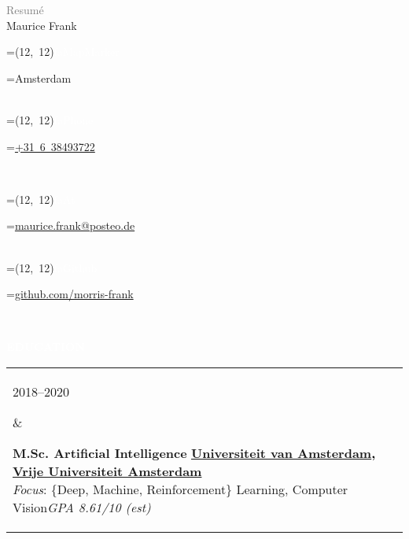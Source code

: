 \documentclass{article}
\newcommand{\vcenteredhbox}[1]{%
	\begingroup%
		\setbox0=\hbox{#1}\parbox{\wd0}{\box0}%
	\endgroup%
}
\newcommand{\icon}[3]{%
	\vcenteredhbox{\colorbox{primary}{\makebox(#2, #2){\textcolor{white}{\large\csname fa#1\endcsname}}}}%
	\hspace{0.2cm}%
	\vcenteredhbox{\textcolor{primary}{#3}}%
}
\newcommand{\cvsect}[1]{
	\vspace{\baselineskip}
	\colorbox{primary}{\textcolor{white}{\MakeUppercase{\textbf{#1}}}}\\
}
\newenvironment{entrylist}{
	\begin{longtable}[H]{l l}
}{
	\end{longtable}
}
\newcommand{\entry}[4]{%
	\parbox[t]{0.175\linewidth}{#1} &
	\parbox[t]{0.825\linewidth}{
		\textbf{#2}%
		\hfill%
		{\footnotesize \textbf{\textcolor{black}{#3}}}\\%
		{\small #4} %
    }\\\\}
\begin{document}
\begin{minipage}[t]{0.4\textwidth}
    \vspace{-\baselineskip}
    {\LARGE\textcolor{gray}{Resumé}}\\

    {\Huge Maurice Frank}
\end{minipage}
\begin{cvbox}
	\icon{MapMarker}{12}{Amsterdam}\\
	\icon{Phone}{12}{\href{tel:0031638493722}{+31 6 38493722}}\\
\end{cvbox}
\begin{cvbox}
    \icon{At}{12}{\href{mailto:maurice.frank@posteo.de}{maurice.frank@posteo.de}}\\
	\icon{Github}{12}{\href{https://github.com/morris-frank}{github.com/morris-frank}}\\
\end{cvbox}

\cvsect{Education}
\begin{entrylist}
    \entry{2018--2020}
    {M.Sc. Artificial Intelligence}
    {\href{https://uva.nl}{Universiteit van Amsterdam}, \href{https://vu.nl}{Vrije Universiteit Amsterdam}}
    {\textit{Focus}: \{Deep, Machine, Reinforcement\} Learning, Computer Vision\hfill\textit{GPA 8.61/10 \scriptsize{(est)}}}

    \entry{2014--2017}
    {B.Sc. Applied Computer Science}
    {\href{https://www.uni-heidelberg.de/en}{University Heidelberg}}
    {\textit{Focus}: Image processing and pattern recognition\hfill\textit{GPA 3.48/4}}

    \entry{2013--2014}
    {B.Sc. Physics}
    {\href{https://www.uni-heidelberg.de/en}{University Heidelberg}}
    {Change of degree after the second semester}

    \entry{2005--2013}
    {A levels}
    {\href{http://www.mpg-online.de/}{Max-Planck Gymnasium, Schorndorf}}
    {\hfill\textit{GPA B-}}
\end{entrylist}
\end{document}

